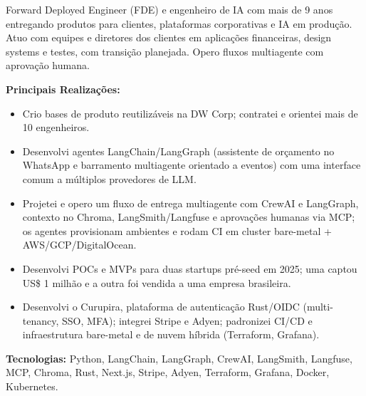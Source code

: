 \documentclass[10pt,a4paper]{altacv}
\begin{document}

\begin{fullwidth}
\makecvheader
\end{fullwidth}



Forward Deployed Engineer (FDE) e engenheiro de IA com mais de 9 anos entregando produtos para clientes, plataformas corporativas e IA em produção. Atuo com equipes e diretores dos clientes em aplicações financeiras, design systems e testes, com transição planejada. Opero fluxos multiagente com aprovação humana.



\textbf{Principais Realizações:}
\begin{itemize}
\setlength{\itemindent}{0.5em}
\item[--] Crio bases de produto reutilizáveis na DW Corp; contratei e orientei mais de 10 engenheiros.
\item[--] Desenvolvi agentes LangChain/LangGraph (assistente de orçamento no WhatsApp e barramento multiagente orientado a eventos) com uma interface comum a múltiplos provedores de LLM.
\item[--] Projetei e opero um fluxo de entrega multiagente com CrewAI e LangGraph, contexto no Chroma, LangSmith/Langfuse e aprovações humanas via MCP; os agentes provisionam ambientes e rodam CI em cluster bare-metal + AWS/GCP/DigitalOcean.
\item[--] Desenvolvi POCs e MVPs para duas startups pré-seed em 2025; uma captou US\$ 1 milhão e a outra foi vendida a uma empresa brasileira.
\item[--] Desenvolvi o Curupira, plataforma de autenticação Rust/OIDC (multi-tenancy, SSO, MFA); integrei Stripe e Adyen; padronizei CI/CD e infraestrutura bare-metal e de nuvem híbrida (Terraform, Grafana).
\end{itemize}
\textbf{Tecnologias:} Python, LangChain, LangGraph, CrewAI, LangSmith, Langfuse, MCP, Chroma, Rust, Next.js, Stripe, Adyen, Terraform, Grafana, Docker, Kubernetes.
\vspace{2mm}
\end{document}
